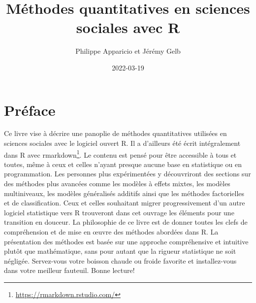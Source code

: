 \documentclass[
  11pt,
  french,
]{book}
\title{Méthodes quantitatives en sciences sociales avec R}
\author{Philippe Apparicio et Jérémy Gelb}
\date{2022-03-19}
\renewcommand{\href}[2]{#2\footnote{\url{#1}}}
\begin{document}
\maketitle



\renewcommand*\listfigurename{Liste des figures}
\renewcommand*\listtablename{Liste des tableaux}

\renewcommand*\contentsname{Table des matières}
{
\hypersetup{linkcolor=}
\setcounter{tocdepth}{2}
\tableofcontents
}
\listoftables
\listoffigures
\hypertarget{pruxe9face}{%
\chapter*{Préface}\label{pruxe9face}}

Ce livre vise à décrire une panoplie de méthodes quantitatives utilisées en sciences sociales avec le logiciel ouvert R. Il a d'ailleurs été écrit intégralement dans R avec \href{https://rmarkdown.rstudio.com/}{rmarkdown}. Le contenu est pensé pour être accessible à tous et toutes, même à ceux et celles n'ayant presque aucune base en statistique ou en programmation. Les personnes plus expérimentées y découvriront des sections sur des méthodes plus avancées comme les modèles à effets mixtes, les modèles multiniveaux, les modèles généralisés additifs ainsi que les méthodes factorielles et de classification. Ceux et celles souhaitant migrer progressivement d'un autre logiciel statistique vers R trouveront dans cet ouvrage les éléments pour une transition en douceur. La philosophie de ce livre est de donner toutes les clefs de compréhension et de mise en œuvre des méthodes abordées dans R. La présentation des méthodes est basée sur une approche compréhensive et intuitive plutôt que mathématique, sans pour autant que la rigueur statistique ne soit négligée. Servez-vous votre boisson chaude ou froide favorite et installez-vous dans votre meilleur fauteuil. Bonne lecture!
\end{document}
